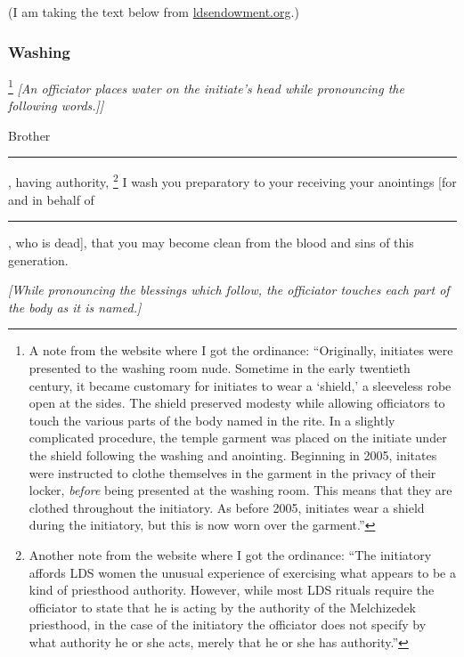 		(I am taking the text below from \href{http://www.ldsendowment.org}{ldsendowment.org}.)
	
		\subsubsection{Washing}
			\label{TEMPLE-ENDOWMENT-INIT-PRE-2005-WASH}
		
			\footnote{%
				\label{TEMPLE-ENDOWMENT-INIT-PRE-2005-WASH-nude}%
				A note from the website where I got the ordinance: ``Originally, initiates were presented to the washing room nude. Sometime in the early twentieth century, it became customary for initiates to wear a `shield,' a sleeveless robe open at the sides. The shield preserved modesty while allowing officiators to touch the various parts of the body named in the rite. In a slightly complicated procedure, the temple garment was placed on the initiate under the shield following the washing and anointing. Beginning in 2005, initates were instructed to clothe themselves in the garment in the privacy of their locker, \textit{before} being presented at the washing room. This means that they are clothed throughout the initiatory. As before 2005, initiates wear a shield during the initiatory, but this is now worn over the garment.''
				}%
			\textit{[An officiator places water on the initiate's head while pronouncing the following words.]]}
			
			Brother \rule{1cm}{0.15mm}, having authority,%
				\footnote{%
					\label{TEMPLE-ENDOWMENT-INIT-PRE-2005-WASH-authority}%
					Another note from the website where I got the ordinance: ``The initiatory affords LDS women the unusual experience of exercising what appears to be a kind of priesthood authority. However, while most LDS rituals require the officiator to state that he is acting by the authority of the Melchizedek priesthood, in the case of the initiatory the officiator does not specify by what authority he or she acts, merely that he or she has authority.''
					}
			I wash you preparatory to your receiving your anointings [for and in behalf of \rule{1cm}{0.15mm}, who is dead], that you may become clean from the blood and sins of this generation.
			
			\textit{[While pronouncing the blessings which follow, the officiator touches each part of the body as it is named.]}
			
